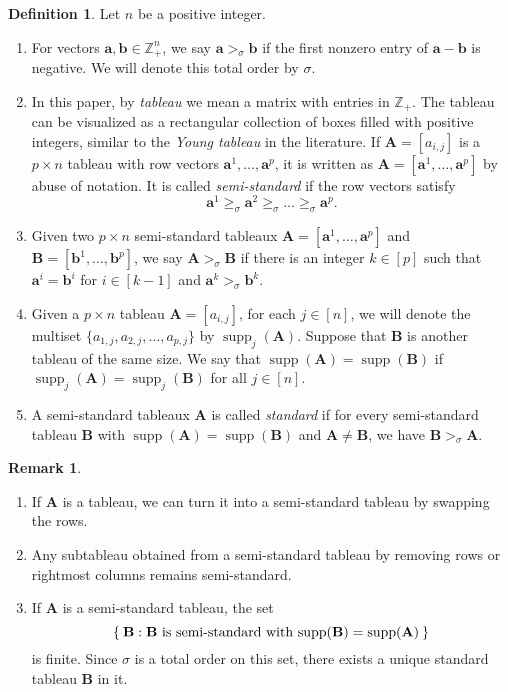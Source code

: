 \documentclass[11pt,a4paper,reqno,dvipsnames]{amsart}
\theoremstyle{plain}
\theoremstyle{definition}
\newtheorem{Assumptions and Discussion}[Theorem]{Assumptions and Discussion}
\newtheorem{Definition}[Theorem]{Definition}
\newtheorem{Remark}[Theorem]{Remark}
\theoremstyle{remark}
\def\supp{\operatorname{supp}}
\def\ZZ{{\mathbb Z}}
\newcommand\bda{{\bm a}}
\newcommand\bdb{{\bm b}}
\newcommand\bfA{\mathbf{A}}
\newcommand\bfB{\mathbf{B}}
\begin{document}
\begin{Definition}
    \label{orderTuple}
    Let $n$ be a positive integer.
    \begin{enumerate}[a]
        \item For vectors $\bda,\bdb \in \ZZ_+^{n}$, we say $\bda>_{\sigma}\bdb$ if the first nonzero entry of $\bda-\bdb$ is negative. We will denote this total order by $\sigma$.

        \item In this paper, by \emph{tableau} we mean a matrix with entries in $\ZZ_+$. The tableau can be visualized as a rectangular collection of boxes filled with positive integers, similar to the \emph{Young tableau} in the literature. If $\bfA=[a_{i,j}]$ is a $p\times n$ tableau with row vectors $\bda^1,\dots,\bda^p$, it is written as $\bfA=[\bda^1,\dots,\bda^p]$ by abuse of notation. It is called \emph{semi-standard} if the row vectors satisfy
            \begin{equation}
                \bda^{1} \ge_{\sigma} \bda^{2} \ge_{\sigma} \dots \ge_{\sigma} \bda^{p}.
                \tag{Cond-1}
                \label{eqn:cond_1}
            \end{equation}
        \item Given two $p\times n$ semi-standard tableaux $\bfA=[\bda^1,\ldots, \bda^p]$ and $\bfB=[\bdb^1,\ldots,\bdb^p]$, we say $\bfA>_{\sigma}\bfB$ if there is an integer $k\in [p]$ such that $\bda^i=\bdb^i$ for $i\in [k-1]$ and $\bda^{k}>_{\sigma}\bdb^k$.
        \item Given a $p\times n$ tableau $\bfA=[a_{i,j}]$, for each $j\in [n]$, we will denote the multiset $\{a_{1,j},a_{2,j},\dots,a_{p,j}\}$ by $\supp_j(\mathbf{A})$. Suppose that $\bfB$ is another tableau of the same size. We say that $\supp(\bfA)=\supp(\bfB)$ if  $\supp_j(\bfA)=\supp_j(\bfB)$ for all $j\in [n]$. 
        \item A semi-standard tableaux $\bfA$ is called \emph{standard} if for every semi-standard tableau $\bfB$ with $\supp(\bfA)=\supp(\bfB)$ and $\bfA\neq \bfB$, we have $\bfB>_{\sigma} \bfA$.
    \end{enumerate}
\end{Definition}


\begin{Remark}
    \label{rmk:reductions}
    \begin{enumerate}[a]
        \item If $\bfA$ is a tableau, we can turn it into a semi-standard tableau by swapping the rows. 
        \item \label{rmk:reductions_b}
        Any subtableau obtained from a semi-standard tableau by removing rows or rightmost columns remains semi-standard.
        \item If $\bfA$ is a semi-standard tableau, the set
            \[
                \Set{\bfB : \text{$\bfB$ is semi-standard with $\supp(\bfB)=\supp(\bfA)$}}
            \]
            is finite. Since $\sigma$ is a total order on this set, there exists a unique standard tableau $\bfB$ in it.
    \end{enumerate} 
\end{Remark}
\end{document}
